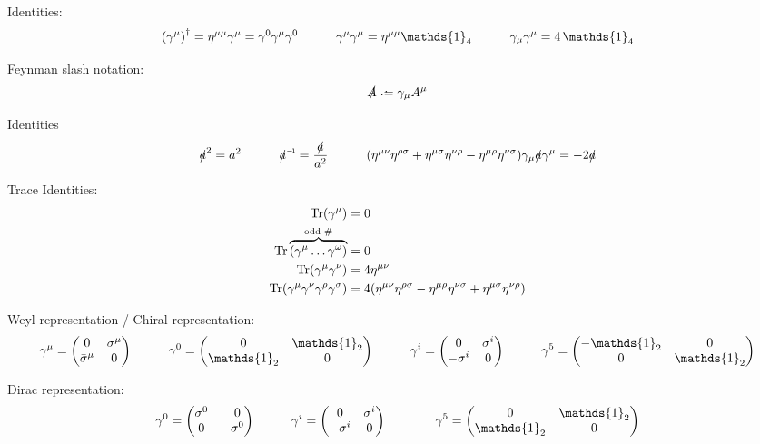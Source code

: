 			\noindent
			Identities:
			\begin{equation}
				\qty(\gamma^\mu)^\dagger = \eta^{\mu\mu} \gamma^\mu = \gamma^0 \gamma^\mu \gamma^0
				\hsp \gamma^\mu \gamma^\mu = \eta^{\mu\mu} \mathds{1}_4
				\hsp \gamma_\mu \gamma^\mu = 4 \,\mathds{1}_4
			\end{equation}

			\noindent
			Feynman slash notation:
			\begin{equation}
				\slashed{A} \defeq \gamma_\mu A^\mu
			\end{equation}

			\noindent
			Identities
			\begin{equation}
				\slashed{a}^2 = a^2
				\hsp \inv{\slashed{a}} = \frac{\slashed{a}}{a^2}
				\hsp \qty(\eta^{\mu\nu}\eta^{\rho\sigma} + \eta^{\mu\sigma}\eta^{\nu\rho} - \eta^{\mu\rho}\eta^{\nu\sigma})
				\gamma_\mu \slashed{a} \gamma^\mu = -2 \slashed{a}
			\end{equation}

			\noindent
			Trace Identities:
			\begin{align}
				\Tr(\gamma^\mu) &= 0 \\
				\Tr\overbrace{({\gamma^\mu\dots\gamma^\omega})}^{\text{odd \#}} &= 0 \\
				\Tr(\gamma^\mu \gamma^\nu) &= 4 \eta^{\mu\nu} \\
				\Tr(\gamma^\mu \gamma^\nu \gamma^\rho \gamma^\sigma) &= 4\qty(\eta^{\mu\nu}\eta^{\rho\sigma} - \eta^{\mu\rho}\eta^{\nu\sigma} + \eta^{\mu\sigma}\eta^{\nu\rho})
			\end{align}

			\noindent
			Weyl representation / Chiral representation:
			\begin{equation}
				\gamma^\mu = \mqty(
				0 & \sigma^\mu \\
				\bar{\sigma}^\mu & 0
				)
				\hsp
				\gamma^0 = \mqty(
				0 & \mathds{1}_2 \\
				\mathds{1}_2 & 0
				)
				\hsp
				\gamma^i = \mqty(
				0 & \sigma^i \\
				-\sigma^i & 0
				)
				\hsp
				\gamma^5 = \mqty(
				-\mathds{1}_2 & 0 \\
				0 & \mathds{1}_2
				)
			\end{equation}

			\noindent
			Dirac representation:
			\begin{equation}
				\begin{aligned}
					\gamma^0
					= \left( \begin{matrix}
							\sigma^0 & \M0       \\
							0        & -\sigma^0
						\end{matrix} \right)
					&\hsp
					\gamma^i = \mqty(
					0 & \sigma^i \\
					-\sigma^i & 0
					)
					&\hsp
					\gamma^5 = \mqty(
					0 & \mathds{1}_2 \\
					\mathds{1}_2 & 0
					)
				\end{aligned}
			\end{equation}

